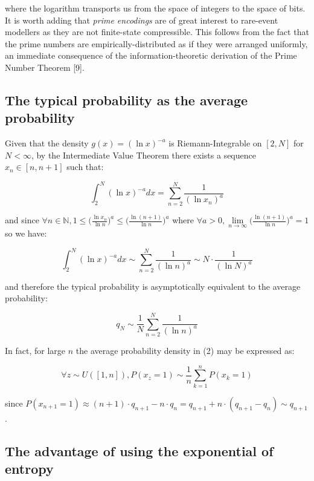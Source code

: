 \documentclass{article}
\begin{document}
where the logarithm transports us from the space of integers to the space of bits. It is worth adding that \textit{prime encodings} are of great interest to rare-event modellers as they are not finite-state compressible. This follows from the fact that the prime numbers are empirically-distributed as if they were arranged uniformly, an immediate consequence of the information-theoretic derivation of the Prime Number Theorem [9]. 

\subsection{The typical probability as the average probability}

Given that the density $g(x) = (\ln x)^{-a}$ is Riemann-Integrable on $[2,N]$ for $N < \infty$, by the Intermediate Value Theorem there exists a sequence $x_n \in [n,n+1]$ such that: 

\begin{equation}
\int_{2}^N (\ln x)^{-a} dx = \sum_{n=2}^N \frac{1}{(\ln x_n)^a}
\end{equation}

and since $\forall n \in \mathbb{N}, 1 \leq \big(\frac{\ln x_n}{\ln n}\big)^a \leq \big(\frac{\ln (n+1)}{\ln n}\big)^a$ where $\forall a > 0, \lim\limits_{n \to \infty} \big(\frac{\ln (n+1)}{\ln n}\big)^a = 1$ so we have: 

\begin{equation}
\int_{2}^N (\ln x)^{-a} dx \sim \sum_{n=2}^N \frac{1}{(\ln n)^a} \sim N \cdot \frac{1}{(\ln N)^a}
\end{equation}

and therefore the typical probability is asymptotically equivalent to the 
average probability: 

\begin{equation}
q_N \sim \frac{1}{N} \sum_{n=2}^N \frac{1}{(\ln n)^a} 	
\end{equation}

In fact, for large $n$ the average probability density in (2) may be expressed as: 

\begin{equation}
\forall z \sim U([1,n]), P(x_z = 1) \sim \frac{1}{n} \sum_{k=1}^n P(x_k = 1)	\end{equation}

since $P(x_{n+1}=1) \approx (n+1) \cdot q_{n+1} - n \cdot q_n = q_{n+1} + n \cdot (q_{n+1}-q_n) \sim q_{n+1}$. 

\subsection{The advantage of using the exponential of entropy}
\end{document}
